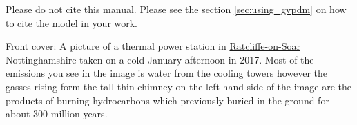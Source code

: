 \ClearWallPaper

\vspace*{\fill}
Please do not cite this manual.  Please see the section \ref{sec:using_gvpdm} on how to cite the model in your work.
\vspace*{\fill}


Front cover: A picture of a thermal power station in \href{https://en.wikipedia.org/wiki/Ratcliffe-on-Soar_Power_Station}{Ratcliffe-on-Soar} Nottinghamshire taken on a cold January afternoon in 2017. Most of the emissions you see in the image is water from the cooling towers however the gasses rising form the tall thin chimney on the left hand side of the image are the products of burning hydrocarbons which previously buried in the ground for about 300 million years.
